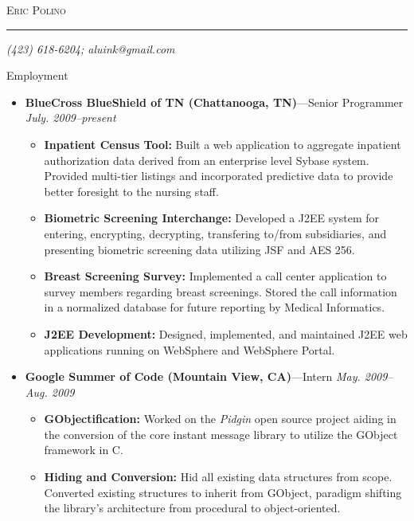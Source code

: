 \documentclass[11pt,oneside]{article}
\makeatletter
\newcommand{\name}{Eric Polino}
\newcommand{\phone}{(423) 618-6204}
\newcommand{\email}{aluink@gmail.com}
\newcommand{\bigname}[1]{
	\begin{center}\fontfamily{phv}\selectfont\Huge\scshape#1\end{center}
}
\newenvironment{ressection}[1]{
	\vspace{4pt}
	{\fontfamily{phv}\selectfont\Large#1}
	\begin{itemize}
	\vspace{3pt}
}{
	\end{itemize}
}
\newcommand{\ressubitem}[1]{
	\vspace{-1pt}
	\item \begin{flushleft} #1 \end{flushleft}
}
\newcommand{\resbigitem}[3]{
	\vspace{-5pt}
	\item
	{\textbf{#1}---#2 \hfill \textit{#3}}
}
\newenvironment{restitledposition}[3]{
	\resbigitem{#1}{#2}{#3}
	\vspace{-2pt}
	\begin{itemize}
}{
	\end{itemize}
}
\makeatother
\begin{document}
 \selectfont

\bigname{\name}

\vspace{-8pt} \rule{\textwidth}{1pt}

\vspace{-1pt} {\small\itshape \hfill \phone; \email \hfill}

\vspace{8 pt}

\begin{ressection}{Employment}

	\begin{restitledposition}{BlueCross BlueShield of TN (Chattanooga, TN)}{Senior
Programmer}{July. 2009--present}

		\ressubitem{\textbf{Inpatient Census Tool:} Built a web application to
		aggregate inpatient authorization data derived from an enterprise level Sybase
		system. Provided multi-tier listings and incorporated predictive data to provide
		better foresight to the nursing staff.}
		
		\ressubitem{\textbf{Biometric Screening Interchange:} Developed a J2EE system
		for entering, encrypting, decrypting, transfering to/from subsidiaries, and
		presenting biometric screening data utilizing JSF and	AES 256.}

		\ressubitem{\textbf{Breast Screening Survey:} Implemented a call center application
		to survey members regarding breast screenings. Stored the call information
		in a normalized database for future reporting by Medical Informatics.}

		\ressubitem{\textbf{J2EE Development:} Designed, implemented, and maintained
		J2EE web applications running on WebSphere and WebSphere Portal.}

	\end{restitledposition}

	\begin{restitledposition}{Google Summer of Code (Mountain View, CA)}{Intern}{May. 2009--Aug. 2009}

		\ressubitem{\textbf{GObjectification:} Worked on the \textit{Pidgin} open source project
		aiding in the conversion of the core instant message library to utilize the 
		GObject framework in C.}

		\ressubitem{\textbf{Hiding and Conversion:} Hid all existing data structures from scope.
		Converted existing structures to inherit from GObject, paradigm shifting the library's 
		architecture from procedural to object-oriented.}
		

\end{restitledposition}
\end{ressection}
\end{document}
